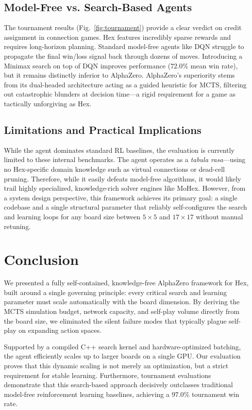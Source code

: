 \documentclass[conference]{IEEEtran}
\begin{document}
\subsection{Model-Free vs. Search-Based Agents}
The tournament results (Fig.~\ref{fig:tournament}) provide a clear verdict on credit assignment in connection games. Hex features incredibly sparse rewards and requires long-horizon planning. Standard model-free agents like DQN struggle to propagate the final win/loss signal back through dozens of moves. Introducing a Minimax search on top of DQN improves performance ($72.0\%$ mean win rate), but it remains distinctly inferior to AlphaZero. AlphaZero's superiority stems from its dual-headed architecture acting as a guided heuristic for MCTS, filtering out catastrophic blunders at decision time---a rigid requirement for a game as tactically unforgiving as Hex.

\subsection{Limitations and Practical Implications}
While the agent dominates standard RL baselines, the evaluation is currently limited to these internal benchmarks. The agent operates as a \emph{tabula rasa}---using no Hex-specific domain knowledge such as virtual connections or dead-cell pruning. Therefore, while it easily defeats model-free algorithms, it would likely trail highly specialized, knowledge-rich solver engines like MoHex. However, from a system design perspective, this framework achieves its primary goal: a single codebase and a single structural parameter that reliably self-configures the search and learning loops for any board size between $5\times5$ and $17\times17$ without manual retuning.

\section{Conclusion}
\label{sec:conclusion}

We presented a fully self-contained, knowledge-free AlphaZero framework for Hex, built around a single governing principle: every critical search and learning parameter must scale automatically with the board dimension. By deriving the MCTS simulation budget, network capacity, and self-play volume directly from the board size, we eliminated the silent failure modes that typically plague self-play on expanding action spaces. 

Supported by a compiled C++ search kernel and hardware-optimized batching, the agent efficiently scales up to larger boards on a single GPU. Our evaluation proves that this dynamic scaling is not merely an optimization, but a strict requirement for stable learning. Furthermore, tournament evaluations demonstrate that this search-based approach decisively outclasses traditional model-free reinforcement learning baselines, achieving a $97.0\%$ tournament win rate.
\end{document}
